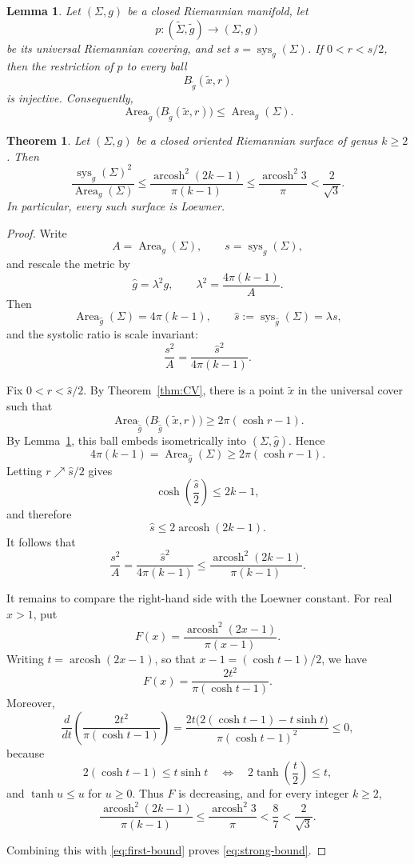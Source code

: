 \documentclass[10pt,a4paper]{amsart}
\newtheorem{theorem}{Theorem}
\newtheorem{lemma}{Lemma}
\DeclareMathOperator{\Area}{Area}
\DeclareMathOperator{\arcosh}{arcosh}
\DeclareMathOperator{\sys}{sys}
\begin{document}
\begin{lemma}\label{lem:embed}
Let $(\Sigma,g)$ be a closed Riemannian manifold, let
\[
  p:(\widetilde\Sigma,\widetilde g)\longrightarrow(\Sigma,g)
\]
be its universal Riemannian covering, and set $s=\sys_g(\Sigma)$. If $0<r<s/2$, then the restriction of $p$ to every ball
\[
  B_{\widetilde g}(\widetilde x,r)
\]
is injective. Consequently,
\[
  \Area_{\widetilde g}\bigl(B_{\widetilde g}(\widetilde x,r)\bigr)
  \leq \Area_g(\Sigma).
\]
\end{lemma}

\begin{theorem}\label{thm:strong}
Let $(\Sigma,g)$ be a closed oriented Riemannian surface of genus $k\geq2$. Then
\begin{equation}\label{eq:strong-bound}
  \frac{\sys_g(\Sigma)^2}{\Area_g(\Sigma)}
  \leq
  \frac{\arcosh^2(2k-1)}{\pi(k-1)}
  \leq
  \frac{\arcosh^2 3}{\pi}
  <\frac{2}{\sqrt3}.
\end{equation}
In particular, every such surface is Loewner.
\end{theorem}

\begin{proof}
Write
\[
  A=\Area_g(\Sigma),
  \qquad
  s=\sys_g(\Sigma),
\]
and rescale the metric by
\[
  \widehat g=\lambda^2g,
  \qquad
  \lambda^2=\frac{4\pi(k-1)}{A}.
\]
Then
\[
  \Area_{\widehat g}(\Sigma)=4\pi(k-1),
  \qquad
  \widehat s:=\sys_{\widehat g}(\Sigma)=\lambda s,
\]
and the systolic ratio is scale invariant:
\[
  \frac{s^2}{A}
  =
  \frac{\widehat s^2}{4\pi(k-1)}.
\]

Fix $0<r<\widehat s/2$. By Theorem~\ref{thm:CV}, there is a point $\widetilde x$ in the universal cover such that
\[
  \Area_{\widetilde{\widehat g}}
  \bigl(B_{\widetilde{\widehat g}}(\widetilde x,r)\bigr)
  \geq 2\pi(\cosh r-1).
\]
By Lemma~\ref{lem:embed}, this ball embeds isometrically into $(\Sigma,\widehat g)$. Hence
\[
  4\pi(k-1)
  =\Area_{\widehat g}(\Sigma)
  \geq 2\pi(\cosh r-1).
\]
Letting $r\nearrow\widehat s/2$ gives
\[
  \cosh\!\left(\frac{\widehat s}{2}\right)\leq 2k-1,
\]
and therefore
\[
  \widehat s\leq 2\arcosh(2k-1).
\]
It follows that
\begin{equation}\label{eq:first-bound}
  \frac{s^2}{A}
  =\frac{\widehat s^2}{4\pi(k-1)}
  \leq
  \frac{\arcosh^2(2k-1)}{\pi(k-1)}.
\end{equation}

It remains to compare the right-hand side with the Loewner constant. For real $x>1$, put
\[
  F(x)=\frac{\arcosh^2(2x-1)}{\pi(x-1)}.
\]
Writing $t=\arcosh(2x-1)$, so that $x-1=(\cosh t-1)/2$, we have
\[
  F(x)=\frac{2t^2}{\pi(\cosh t-1)}.
\]
Moreover,
\[
  \frac{d}{dt}\left(\frac{2t^2}{\pi(\cosh t-1)}\right)
  =
  \frac{2t\bigl(2(\cosh t-1)-t\sinh t\bigr)}{\pi(\cosh t-1)^2}
  \leq0,
\]
because
\[
  2(\cosh t-1)\leq t\sinh t
  \quad\Longleftrightarrow\quad
  2\tanh\!\left(\frac t2\right)\leq t,
\]
and $\tanh u\leq u$ for $u\geq0$. Thus $F$ is decreasing, and for every integer $k\geq2$,
\[
  \frac{\arcosh^2(2k-1)}{\pi(k-1)}\leq \frac{\arcosh^2 3}{\pi}<\frac87<\frac{2}{\sqrt{3}}.
\]

Combining this with \eqref{eq:first-bound} proves \eqref{eq:strong-bound}.
\end{proof}
\end{document}

